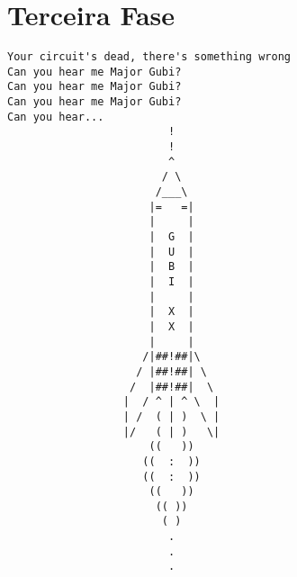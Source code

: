 \documentclass[12pt,a4paper]{article}
\begin{document}
		\section{Terceira Fase}
	\begin{verbatim}
Your circuit's dead, there's something wrong
Can you hear me Major Gubi?
Can you hear me Major Gubi?
Can you hear me Major Gubi?
Can you hear...
                         !
                         !
                         ^
                        / \
                       /___\
                      |=   =|
                      |     |
                      |  G  |
                      |  U  |
                      |  B  |
                      |  I  |
                      |     |
                      |  X  |
                      |  X  |
                      |     |
                     /|##!##|\
                    / |##!##| \
                   /  |##!##|  \
                  |  / ^ | ^ \  |
                  | /  ( | )  \ |
                  |/   ( | )   \|
                      ((   ))
                     ((  :  ))
                     ((  :  ))
                      ((   ))
                       (( ))
                        ( )
                         .
                         .
                         .
	\end{verbatim}		
\end{document}
